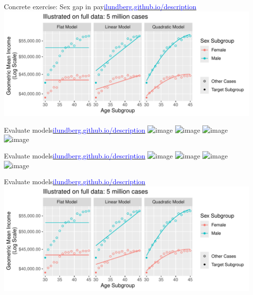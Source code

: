 \documentclass{beamer}
\begin{document}
\begin{frame}{Concrete exercise: Sex gap in pay}{\href{https://ilundberg.github.io/description/}{\textcolor{blue}{ilundberg.github.io/description}}}
\includegraphics[width = \textwidth]{define_models}
\end{frame}

\begin{frame}{Evaluate models}{\href{https://ilundberg.github.io/description/}{\textcolor{blue}{ilundberg.github.io/description}}}
\includegraphics<1>[width = .8\textwidth]{histogram_0}
\includegraphics<2>[width = .8\textwidth]{histogram_1}
\includegraphics<3>[width = .8\textwidth]{histogram_2}
\includegraphics<4>[width = .8\textwidth]{histogram_3}
\end{frame}

\begin{frame}{Evaluate models}{\href{https://ilundberg.github.io/description/}{\textcolor{blue}{ilundberg.github.io/description}}}
\includegraphics<1>[width = .8\textwidth]{mse_0}
\includegraphics<2>[width = .8\textwidth]{mse_1}
\includegraphics<3>[width = .8\textwidth]{mse_2}
\includegraphics<4>[width = .8\textwidth]{mse_3}
\end{frame}

\begin{frame}{Evaluate models}{\href{https://ilundberg.github.io/description/}{\textcolor{blue}{ilundberg.github.io/description}}}
\includegraphics[width = \textwidth]{define_models}
\end{frame}
\end{document}
